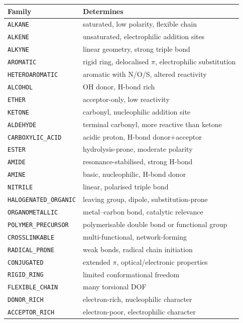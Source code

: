 \documentclass[11pt]{article}
\begin{document}
\begin{center}
\begin{longtable}{lp{8.5cm}}
\toprule
Family & Determines \\
\midrule
\endhead
\texttt{ALKANE}               & saturated, low polarity, flexible chain \\
\texttt{ALKENE}               & unsaturated, electrophilic addition sites \\
\texttt{ALKYNE}               & linear geometry, strong triple bond \\
\texttt{AROMATIC}             & rigid ring, delocalised $\pi$, electrophilic substitution \\
\texttt{HETEROAROMATIC}       & aromatic with N/O/S, altered reactivity \\
\texttt{ALCOHOL}              & OH donor, H-bond rich \\
\texttt{ETHER}                & acceptor-only, low reactivity \\
\texttt{KETONE}               & carbonyl, nucleophilic addition site \\
\texttt{ALDEHYDE}             & terminal carbonyl, more reactive than ketone \\
\texttt{CARBOXYLIC\_ACID}     & acidic proton, H-bond donor+acceptor \\
\texttt{ESTER}                & hydrolysis-prone, moderate polarity \\
\texttt{AMIDE}                & resonance-stabilised, strong H-bond \\
\texttt{AMINE}                & basic, nucleophilic, H-bond donor \\
\texttt{NITRILE}              & linear, polarised triple bond \\
\texttt{HALOGENATED\_ORGANIC} & leaving group, dipole, substitution-prone \\
\texttt{ORGANOMETALLIC}       & metal--carbon bond, catalytic relevance \\
\texttt{POLYMER\_PRECURSOR}   & polymerisable double bond or functional group \\
\texttt{CROSSLINKABLE}        & multi-functional, network-forming \\
\texttt{RADICAL\_PRONE}       & weak bonds, radical chain initiation \\
\texttt{CONJUGATED}           & extended $\pi$, optical/electronic properties \\
\texttt{RIGID\_RING}          & limited conformational freedom \\
\texttt{FLEXIBLE\_CHAIN}      & many torsional DOF \\
\texttt{DONOR\_RICH}          & electron-rich, nucleophilic character \\
\texttt{ACCEPTOR\_RICH}       & electron-poor, electrophilic character \\
\bottomrule
\end{longtable}
\end{center}
\end{document}
